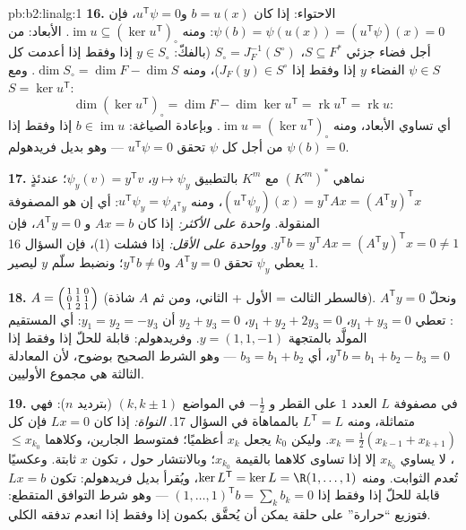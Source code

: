 \begin{solution}{pb:b2:linalg:1}
\textbf{16.} الاحتواء: إذا كان $b = u(x)$ و$u^{\mathsf T}\psi =
0$، فإن $\psi(b) = \psi(u(x)) = (u^{\mathsf T}\psi)(x) = 0$: ومنه
$\operatorname{im} u \subseteq (\ker u^{\mathsf T})_\circ$.
الأبعاد: من أجل فضاء جزئي $S \subseteq F^*$، $S_\circ =
J_F^{-1}(S^\circ)$ (بالفكّ: $y \in S_\circ$ إذا وفقط إذا أعدمت كل $\psi \in
S$ الفضاء $y$ إذا وفقط إذا $J_F(y) \in S^\circ$)، ومنه $\dim S_\circ = \dim
F - \dim S$. ومع $S = \ker u^{\mathsf T}$:
\[
\dim(\ker u^{\mathsf T})_\circ
= \dim F - \dim\ker u^{\mathsf T}
= \operatorname{rk} u^{\mathsf T} = \operatorname{rk} u :
\]
أي تساوي الأبعاد، ومنه $\operatorname{im} u = (\ker
u^{\mathsf T})_\circ$. وبإعادة الصياغة: $b \in \operatorname{im} u$ إذا وفقط إذا
$\psi(b) = 0$ من أجل كل $\psi$ تحقق $u^{\mathsf T}\psi = 0$ ---
وهو بديل فريدهولم.

\textbf{17.} نماهي $(K^m)^*$ مع $K^m$ بالتطبيق $y \mapsto \psi_y$،
$\psi_y(v) = y^{\mathsf T}v$؛ عندئذٍ $(u^{\mathsf T}\psi_y)(x) =
y^{\mathsf T}Ax = (A^{\mathsf T}y)^{\mathsf T}x$، ومنه $u^{\mathsf
T}\psi_y = \psi_{A^{\mathsf T}y}$: أي إن  هو
المصفوفة المنقولة. \emph{واحدة على الأكثر:} إذا كان $Ax = b$ و
$A^{\mathsf T}y = 0$، فإن $y^{\mathsf T}b = y^{\mathsf T}Ax =
(A^{\mathsf T}y)^{\mathsf T}x = 0 \neq 1$. \emph{وواحدة على الأقل:}
إذا فشلت (1)، فإن السؤال 16 يعطي $\psi_y$ تحقق $A^{\mathsf T}y
= 0$ و$y^{\mathsf T}b \neq 0$؛ ونضبط سلّم $y$ ليصير $1$.

\textbf{18.} $A = \begin{psmallmatrix} 1 & 1 & 0\\ 0 & 1 & 1\\
1 & 2 & 1\end{psmallmatrix}$ (فالسطر الثالث = الأول + الثاني، ومن ثم
$A$ شاذة). ونحلّ $A^{\mathsf T}y = 0$: تعطي $y_1 + y_3 = 0$، $y_1
+ y_2 + 2y_3 = 0$، $y_2 + y_3 = 0$ أن $y_1 = y_2 = -y_3$: أي
المستقيم المولَّد بالمتجهة $y = (1, 1, -1)$. وفريدهولم: قابلة للحلّ إذا وفقط إذا
$y^{\mathsf T}b = b_1 + b_2 - b_3 = 0$، أي $b_3 = b_1 + b_2$
--- وهو الشرط الصحيح بوضوح، لأن المعادلة الثالثة هي
مجموع الأوليين.

\textbf{19.} في مصفوفة $L$ العدد $1$ على القطر و
$-\frac12$ في المواضع $(k, k\pm1)$ (بترديد $n$): فهي متماثلة، ومنه
$L^{\mathsf T} = L$ بالمماهاة في السؤال 17.
\emph{النواة:} إذا كان $Lx = 0$ فإن كل $x_k = \frac12(x_{k-1} +
x_{k+1})$. وليكن $k_0$ يجعل $x_k$ أعظميًا؛ فمتوسط الجارين، وكلاهما $\leq x_{k_0}$، لا يساوي $x_{k_0}$ إلا إذا تساوى كلاهما
بالقيمة $x_{k_0}$؛ وبالانتشار حول ، تكون $x$ ثابتة.
وعكسيًا تُعدم الثوابت. ومنه $\ker L^{\mathsf T} = \ker L
= \R(1, \dots, 1)$، ويُقرأ بديل فريدهولم: تكون $Lx = b$
قابلة للحلّ إذا وفقط إذا $(1,\dots,1)^{\mathsf T} b = \sum_k b_k = 0$ ---
وهو شرط التوافق المتقطع: فتوزيع ``حرارة'' على
حلقة يمكن أن يُحقَّق بكمون إذا وفقط إذا انعدم تدفقه
الكلي.


\end{solution}
